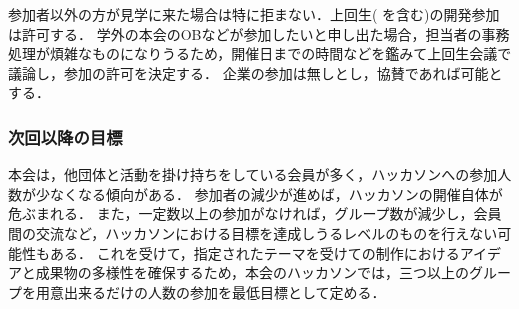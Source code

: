 参加者以外の方が見学に来た場合は特に拒まない．上回生(\fourthGrade{} を含む)の開発参加は許可する．
学外の本会のOBなどが参加したいと申し出た場合，担当者の事務処理が煩雑なものになりうるため，開催日までの時間などを鑑みて上回生会議で議論し，参加の許可を決定する．
企業の参加は無しとし，協賛であれば可能とする．

\subsubsection*{次回以降の目標}
本会は，他団体と活動を掛け持ちをしている会員が多く，ハッカソンへの参加人数が少なくなる傾向がある．
参加者の減少が進めば，ハッカソンの開催自体が危ぶまれる．
また，一定数以上の参加がなければ，グループ数が減少し，会員間の交流など，ハッカソンにおける目標を達成しうるレベルのものを行えない可能性もある．
これを受けて，指定されたテーマを受けての制作におけるアイデアと成果物の多様性を確保するため，本会のハッカソンでは，三つ以上のグループを用意出来るだけの人数の参加を最低目標として定める．
